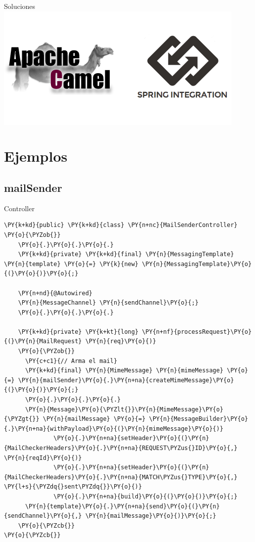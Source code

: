 \documentclass{beamer}
\begin{document}
\begin{frame}{Soluciones}
\includegraphics[width= 0.9\linewidth]{camel-spring}
\end{frame}

\section{Ejemplos}
\subsection{mailSender}
\begin{frame}[fragile]{Controller}
\begin{Verbatim}[fontsize=\tiny,commandchars=\\\{\}]
\PY{k+kd}{public} \PY{k+kd}{class} \PY{n+nc}{MailSenderController}
\PY{o}{\PYZob{}}
    \PY{o}{.}\PY{o}{.}\PY{o}{.}
    \PY{k+kd}{private} \PY{k+kd}{final} \PY{n}{MessagingTemplate} \PY{n}{template} \PY{o}{=} \PY{k}{new} \PY{n}{MessagingTemplate}\PY{o}{(}\PY{o}{)}\PY{o}{;}

    \PY{n+nd}{@Autowired}
    \PY{n}{MessageChannel} \PY{n}{sendChannel}\PY{o}{;}
    \PY{o}{.}\PY{o}{.}\PY{o}{.}
    
    \PY{k+kd}{private} \PY{k+kt}{long} \PY{n+nf}{processRequest}\PY{o}{(}\PY{n}{MailRequest} \PY{n}{req}\PY{o}{)}
    \PY{o}{\PYZob{}}
      \PY{c+c1}{// Arma el mail}
      \PY{k+kd}{final} \PY{n}{MimeMessage} \PY{n}{mimeMessage} \PY{o}{=} \PY{n}{mailSender}\PY{o}{.}\PY{n+na}{createMimeMessage}\PY{o}{(}\PY{o}{)}\PY{o}{;}
      \PY{o}{.}\PY{o}{.}\PY{o}{.}
      \PY{n}{Message}\PY{o}{\PYZlt{}}\PY{n}{MimeMessage}\PY{o}{\PYZgt{}} \PY{n}{mailMessage} \PY{o}{=} \PY{n}{MessageBuilder}\PY{o}{.}\PY{n+na}{withPayload}\PY{o}{(}\PY{n}{mimeMessage}\PY{o}{)}
              \PY{o}{.}\PY{n+na}{setHeader}\PY{o}{(}\PY{n}{MailCheckerHeaders}\PY{o}{.}\PY{n+na}{REQUEST\PYZus{}ID}\PY{o}{,} \PY{n}{reqId}\PY{o}{)}
              \PY{o}{.}\PY{n+na}{setHeader}\PY{o}{(}\PY{n}{MailCheckerHeaders}\PY{o}{.}\PY{n+na}{MATCH\PYZus{}TYPE}\PY{o}{,} \PY{l+s}{\PYZdq{}sent\PYZdq{}}\PY{o}{)}
              \PY{o}{.}\PY{n+na}{build}\PY{o}{(}\PY{o}{)}\PY{o}{;}
      \PY{n}{template}\PY{o}{.}\PY{n+na}{send}\PY{o}{(}\PY{n}{sendChannel}\PY{o}{,} \PY{n}{mailMessage}\PY{o}{)}\PY{o}{;}      
    \PY{o}{\PYZcb{}}
\PY{o}{\PYZcb{}}
\end{Verbatim}
\end{frame}
\end{document}
